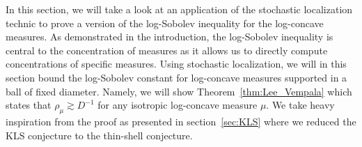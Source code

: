 In this section, we will take a look at an application of the stochastic localization technic 
to prove a version of the log-Sobolev inequality for the log-concave measures. As demonstrated in the 
introduction, the log-Sobolev inequality is central to the concentration of 
measures as it allows us to directly compute concentrations of specific measures. Using stochastic localization, 
we will in this section bound the log-Sobolev constant for log-concave measures 
supported in a ball of fixed diameter. Namely, we will show Theorem~\ref{thm:Lee_Vempala} which states that 
\(\rho_\mu \gtrsim D^{-1}\) for any isotropic log-concave measure \(\mu\). 
We take heavy inspiration from the proof as presented in section~\ref{sec:KLS}
where we reduced the KLS conjecture to the thin-shell conjecture.




